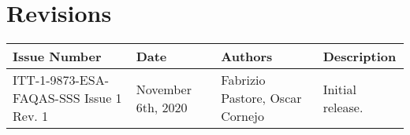 
\section*{Revisions}
\label{sec:revisions}


\setlength\LTleft{0pt}
\setlength\LTright{0pt}
\tiny 
\begin{longtable}{|p{2cm}|p{1cm}|p{1.5cm}|p{9cm}|@{}}
\label{table:codeoperators} \\
\hline
\textbf{Issue Number}&\textbf{Date}&\textbf{Authors}&\textbf{Description}\\
\hline
ITT-1-9873-ESA-FAQAS-SSS
Issue 1 Rev. 1&
November 6th, 2020&
Fabrizio Pastore, Oscar Cornejo&
\begin{minipage}{8cm}
Initial release.
\end{minipage}
\\
\hline



                                                    
\end{longtable}
\normalsize

\clearpage